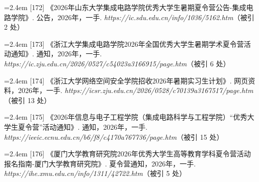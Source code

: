 {\nopagebreak\vspace{1pt}
\noindent\hangindent=2.4em \label{src:S0214}{\color{cAccent}[172]} 《2026年山东大学集成电路学院优秀大学生暑期夏令营公告-集成电路学院》. 公告，2026年，一手. \textit{https://ic.sdu.edu.cn/info/1036/5162.htm}（被引 2 处）\par
\vspace{0.6pt}
\vspace{3.5pt}\par
\nopagebreak\vspace{1pt}
\noindent\hangindent=2.4em \label{src:S0215}{\color{cAccent}[173]} 《浙江大学集成电路学院2026年全国优秀大学生暑期学术夏令营活动通知》. 通知，2026年，一手. \textit{https://ic.zju.edu.cn/2026/0527/c54023a3166915/page.htm}（被引 6 处）\par
\vspace{0.6pt}
\noindent\hangindent=2.4em \label{src:S0216}{\color{cAccent}[174]} 《浙江大学网络空间安全学院招收2026年暑期实习生计划》. 网页资料，2026年，一手. \textit{https://icsr.zju.edu.cn/2026/0528/c70139a3167517/page.htm}（被引 13 处）\par
\vspace{0.6pt}
\vspace{3.5pt}\par
\nopagebreak\vspace{1pt}
\noindent\hangindent=2.4em \label{src:S0217}{\color{cAccent}[175]} 《2026年信息与电子工程学院（集成电路科学与工程学院）“优秀大学生夏令营”活动通知》. 通知，2026年，一手. \textit{https://ieeic.ecnu.edu.cn/b6/f8/c4170a767736/page.htm}（被引 15 处）\par
\vspace{0.6pt}
\vspace{3.5pt}\par
\nopagebreak\vspace{1pt}
\noindent\hangindent=2.4em \label{src:S0218}{\color{cAccent}[176]} 《厦门大学教育研究院2026年优秀大学生高等教育学科夏令营活动报名指南-厦门大学教育研究院》. 夏令营通知，2026年，一手. \textit{https://ihe.xmu.edu.cn/info/1311/42722.htm}（被引 5 处）\par
\vspace{0.6pt}
\vspace{3.5pt}\par
\nopagebreak\vspace{1pt}
}
